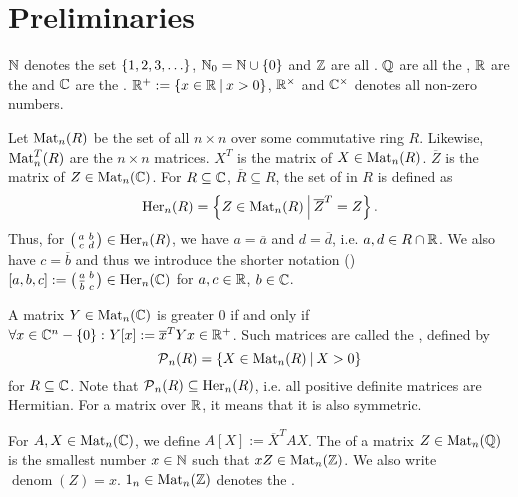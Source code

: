 

\section{Preliminaries}

$\mathbb{N}$ denotes the set $\Set{1,2,3,\dots}$, $\N_0 = \N \cup \Set{0}$ and $\mathbb{Z}$ are all . $\mathbb{Q}$ are all the , $\mathbb{R}$ are the  and $\mathbb{C}$ are the . $\R^+ := \Set{x\in\R}{x>0}$, $\mathbb{R}^\times$ and $\mathbb{C}^\times$ denotes all non-zero numbers.

Let $\operatorname{Mat}_n(R)$ be the set of all $n \times n$  over some commutative ring $R$.
Likewise, $\operatorname{Mat}_n^T(R)$ are the  $n \times n$ matrices.
$X^T$ is the  matrix of $X \in \operatorname{Mat}_n(R)$.
$\overline{Z}$ is the  matrix of $Z \in \operatorname{Mat}_n(\mathbb{C})$.
For $R \subseteq \mathbb{C}$, $\overline{R} \subseteq R$, the set of  in $R$ is defined as
\[ \Her_n(R) = \Set{Z \in \M_n(R)}{\overline{Z}^T = Z} . \]
Thus, for $\left( \begin{smallmatrix} a & b \\ c & d \end{smallmatrix} \right) \in \operatorname{Her}_n(R)$, we have $a = \overline{a}$ and $d = \overline{d}$, i.e. $a,d \in R \cap \mathbb{R}$. We also have $c = \overline{b}$ and thus we introduce the shorter notation () $[a,b,c] := \left( \begin{smallmatrix} a & b \\ \overline{b} & c \end{smallmatrix} \right) \in \operatorname{Her}_n(\mathbb{C})$ for $a,c \in \mathbb{R}$, $b \in \mathbb{C}$.

A matrix $Y \in \operatorname{Mat}_n(\mathbb{C})$ is greater $0$ if and only if $\forall x \in \C^n - \Set{0} \colon Y[x] := \overline{x}^{T} Y x \in \R^+$.
Such matrices are called the , defined by
\[ \PM_n(R) = \Set{X \in \M_n(R)}{X > 0} \]
for $R \subseteq \mathbb{C}$. Note that $\operatorname{\mathcal{P}}_n(R) \subseteq \operatorname{Her}_n(R)$, i.e. all positive definite matrices are Hermitian. For a matrix over $\mathbb{R}$, it means that it is also symmetric.

For $A,X \in \operatorname{Mat}_n(\mathbb{C})$, we define $A[X] := \overline{X}^T A X$. 
The  of a matrix $Z \in \operatorname{Mat}_n(\mathbb{Q})$ is the smallest number $x \in \mathbb{N}$ such that $x Z \in \operatorname{Mat}_n(\mathbb{Z})$. We also write $\operatorname{denom}(Z) = x$. $1_n \in \operatorname{Mat}_n(\mathbb{Z})$ denotes the .

